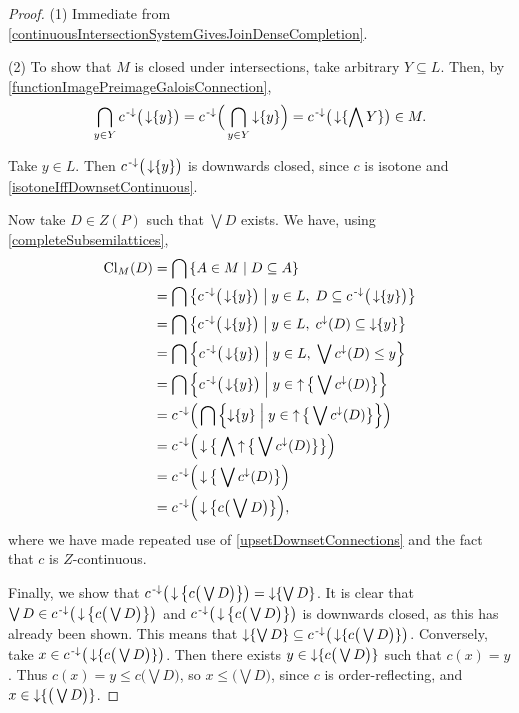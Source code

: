 \begin{proof}
(1) Immediate from \ref{continuousIntersectionSystemGivesJoinDenseCompletion}.

(2) To show that $M$ is closed under intersections, take arbitrary $Y\subseteq L$. Then, by \ref{functionImagePreimageGaloisConnection},
\[ \bigcap_{y\in Y} c^{\text{\hspace{0.15em}-}\downarrow}\big(\operatorname{\downarrow} \{y\}\big) = c^{\text{\hspace{0.15em}-}\downarrow}\Big(\bigcap_{y\in Y}\operatorname{\downarrow} \{y\}\Big) = c^{\text{\hspace{0.15em}-}\downarrow}\big(\operatorname{\downarrow}\{\bigwedge Y\}\big) \in M. \]

Take $y\in L$. Then $c^{\text{\hspace{0.15em}-}\downarrow}\big(\operatorname{\downarrow} \{y\}\big)$ is downwards closed, since $c$ is isotone and \ref{isotoneIffDownsetContinuous}.

Now take $D\in Z(P)$ such that $\bigvee D$ exists. We have, using \ref{completeSubsemilattices},
\begin{align*}
\Closure_M(D) &= \bigcap \setbuilder{A \in M}{D \subseteq A} \\
&= \bigcap \setbuilder{c^\preimf\big(\downset \{y\}\big)}{y\in L,\; D \subseteq c^\preimf\big(\downset \{y\}\big)} \\
&= \bigcap \setbuilder{c^\preimf\big(\downset \{y\}\big)}{y\in L,\; c^\imf(D) \subseteq \downset \{y\}} \\
&= \bigcap \setbuilder{c^\preimf\big(\downset \{y\}\big)}{y\in L,\; \bigvee c^\imf(D) \leq y} \\
&= \bigcap \setbuilder{c^\preimf\big(\downset \{y\}\big)}{y\in \upset\big\{\bigvee c^\imf(D)\big\}} \\
&= c^\preimf\Big(\bigcap \setbuilder{\downset \{y\}}{y\in \upset\big\{\bigvee c^\imf(D)\big\}}\Big) \\
&= c^\preimf\Big(\downset\big\{\bigwedge \upset\big\{\bigvee c^\imf(D)\big\}\big\}\Big) \\
&= c^\preimf\Big(\downset\big\{\bigvee c^\imf(D)\big\}\Big) \\
&= c^\preimf\Big(\downset\big\{c\big(\bigvee D\big)\big\}\Big),
\end{align*}
where we have made repeated use of \ref{upsetDownsetConnections} and the fact that $c$ is $Z$-continuous.

Finally, we show that $c^{\text{\hspace{0.15em}-}\downarrow}\big(\operatorname{\downarrow}\big\{c\big(\bigvee D\big)\big\}\big) = \operatorname{\downarrow}\{\bigvee D\}$. It is clear that $\bigvee D \in c^{\text{\hspace{0.15em}-}\downarrow}\big(\operatorname{\downarrow}\big\{c\big(\bigvee D\big)\big\}\big)$ and $c^{\text{\hspace{0.15em}-}\downarrow}\big(\operatorname{\downarrow}\big\{c\big(\bigvee D\big)\big\}\big)$ is downwards closed, as this has already been shown. This means that $\operatorname{\downarrow} \{\bigvee D\} \subseteq c^{\text{\hspace{0.15em}-}\downarrow}\big(\operatorname{\downarrow} \{c\big(\bigvee D\big)\}\big)$. Conversely, take $x \in c^{\text{\hspace{0.15em}-}\downarrow}\big(\operatorname{\downarrow} \{c\big(\bigvee D\big)\}\big)$. Then there exists $y \in \operatorname{\downarrow} \{c\big(\bigvee D\big)\}$ such that $c(x) = y$. Thus $c(x) = y \leq c\big(\bigvee D\big)$, so $x\leq \big(\bigvee D\big)$, since $c$ is order-reflecting, and $x\in \operatorname{\downarrow}\{\big(\bigvee D\big)\}$. 


\end{proof}
